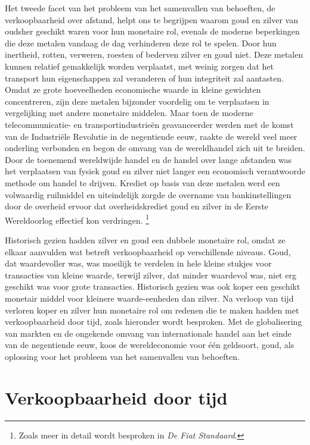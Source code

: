 \documentclass[
  a5paper,
  smalldemyvopaper,11pt,twoside,onecolumn,openright,extrafontsizes,
hidelinks]{memoir}
\begin{document}
Het tweede facet van het probleem van het samenvallen van behoeften, de
verkoopbaarheid over afstand, helpt ons te begrijpen waarom goud en
zilver van oudsher geschikt waren voor hun monetaire rol, evenals de
moderne beperkingen die deze metalen vandaag de dag verhinderen deze rol
te spelen. Door hun inertheid, rotten, verweren, roesten of bederven
zilver en goud niet. Deze metalen kunnen relatief gemakkelijk worden
verplaatst, met weinig zorgen dat het transport hun eigenschappen zal
veranderen of hun integriteit zal aantasten. Omdat ze grote hoeveelheden
economische waarde in kleine gewichten concentreren, zijn deze metalen
bijzonder voordelig om te verplaatsen in vergelijking met andere
monetaire middelen. Maar toen de moderne telecommunicatie- en
transportindustrieën geavanceerder werden met de komst van de
Industriële Revolutie in de negentiende eeuw, raakte de wereld veel meer
onderling verbonden en begon de omvang van de wereldhandel zich uit te
breiden. Door de toenemend wereldwijde handel en de handel over lange
afstanden was het verplaatsen van fysiek goud en zilver niet langer een
economisch verantwoorde methode om handel te drijven. Krediet op basis
van deze metalen werd een volwaardig ruilmiddel en uiteindelijk zorgde
de overname van bankinstellingen door de overheid ervoor dat
overheidskrediet goud en zilver in de Eerste Wereldoorlog effectief kon
verdringen. \footnote{Zoals meer in detail wordt besproken in \emph{De
  Fiat Standaard}.}

Historisch gezien hadden zilver en goud een dubbele monetaire rol, omdat
ze elkaar aanvulden wat betreft verkoopbaarheid op verschillende
niveaus. Goud, dat waardevoller was, was moeilijk te verdelen in hele
kleine stukjes voor transacties van kleine waarde, terwijl zilver, dat
minder waardevol was, niet erg geschikt was voor grote transacties.
Historisch gezien was ook koper een geschikt monetair middel voor
kleinere waarde-eenheden dan zilver. Na verloop van tijd verloren koper
en zilver hun monetaire rol om redenen die te maken hadden met
verkoopbaarheid door tijd, zoals hieronder wordt besproken. Met de
globalisering van markten en de ongekende omvang van internationale
handel aan het einde van de negentiende eeuw, koos de wereldeconomie
voor één geldsoort, goud, als oplossing voor het probleem van het
samenvallen van behoeften.

\section{Verkoopbaarheid door tijd}\label{verkoopbaarheid-door-tijd}
\end{document}

